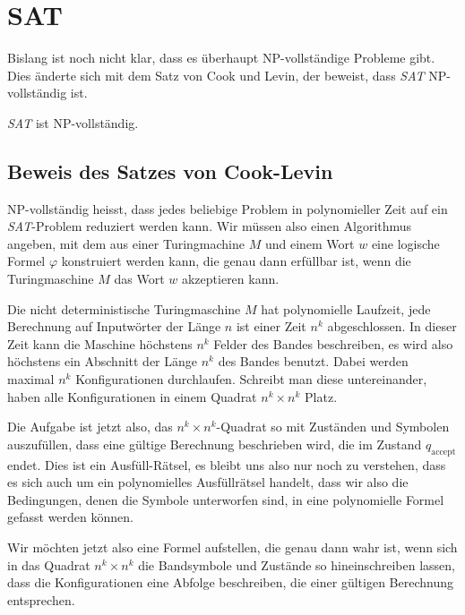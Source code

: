 %
%
%
\section{SAT}
%
%
Bislang ist noch nicht klar, dass es überhaupt NP-vollständige
Probleme gibt.
Dies änderte sich mit dem Satz von Cook und Levin,
der beweist, dass \textsl{SAT} NP-vollständig ist.

\begin{satz}
\label{cooklevin}
\textsl{SAT} ist NP-vollständig.
\end{satz}




\subsection{Beweis des Satzes von Cook-Levin}

NP-vollständig heisst, dass jedes beliebige Problem in polynomieller
Zeit auf ein \textsl{SAT}-Problem reduziert werden kann.
Wir müssen
also einen Algorithmus angeben, mit dem aus einer Turingmachine
$M$ und einem Wort $w$
eine logische Formel $\varphi$ konstruiert werden kann, die genau
dann erfüllbar ist, wenn die Turingmaschine $M$ das Wort $w$
akzeptieren kann.

Die nicht deterministische Turingmaschine $M$ hat polynomielle Laufzeit,
jede Berechnung auf Inputwörter der Länge $n$ ist einer Zeit $n^k$
abgeschlossen.
In dieser Zeit kann die Maschine höchstens $n^k$ Felder
des Bandes beschreiben, es wird also höchstens ein Abschnitt der
Länge $n^k$ des Bandes benutzt.
Dabei werden maximal $n^k$ Konfigurationen durchlaufen.
Schreibt man diese untereinander,
haben alle Konfigurationen in einem Quadrat $n^k\times n^k$
Platz.

Die Aufgabe ist jetzt also, das $n^k \times n^k$-Quadrat so mit Zuständen
und Symbolen auszufüllen, dass eine gültige Berechnung beschrieben wird,
die im Zustand $q_{\text{accept}}$ endet.
Dies ist ein Ausfüll-Rätsel, es bleibt uns also nur noch zu verstehen,
dass es sich auch um ein polynomielles Ausfüllrätsel handelt,
dass wir also die Bedingungen, denen die Symbole unterworfen sind,
in eine polynomielle Formel gefasst werden können.

Wir möchten jetzt also eine Formel aufstellen, die genau dann wahr
ist, wenn sich in das Quadrat $n^k\times n^k$ die Bandsymbole und
Zustände so hineinschreiben lassen, dass die Konfigurationen eine
Abfolge beschreiben, die einer gültigen Berechnung entsprechen.

